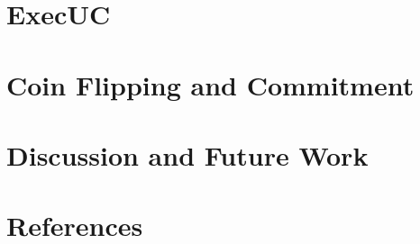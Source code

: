 \documentclass[conference]{IEEEtran}
\begin{document}
%

\section{ExecUC} \label{sec:execuc}


\section{Coin Flipping and Commitment} \label{sec:commitment}


%

%
%
%

\section{Discussion and Future Work}


\section*{References}






\appendix
\end{document}
